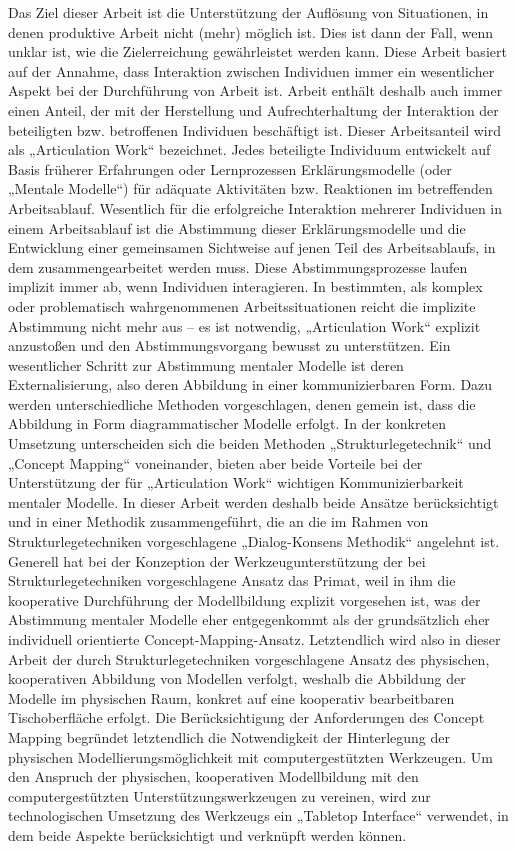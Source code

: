 Das Ziel dieser Arbeit ist die Unterstützung der Auflösung von Situationen, in denen produktive Arbeit nicht (mehr) möglich ist. Dies ist dann der Fall, wenn unklar ist, wie die Zielerreichung gewährleistet werden kann. Diese Arbeit basiert auf der Annahme, dass Interaktion zwischen Individuen immer ein wesentlicher Aspekt bei der Durchführung von Arbeit ist. Arbeit enthält deshalb auch immer einen Anteil, der mit der Herstellung und Aufrechterhaltung der Interaktion der beteiligten bzw. betroffenen Individuen beschäftigt ist. Dieser Arbeitsanteil wird als „Articulation Work“ bezeichnet. Jedes beteiligte Individuum entwickelt auf Basis früherer Erfahrungen oder Lernprozessen Erklärungsmodelle (oder „Mentale Modelle“) für adäquate Aktivitäten bzw. Reaktionen im betreffenden Arbeitsablauf. Wesentlich für die erfolgreiche Interaktion mehrerer Individuen in einem Arbeitsablauf ist die Abstimmung dieser Erklärungsmodelle und die Entwicklung einer gemeinsamen Sichtweise auf jenen Teil des Arbeitsablaufs, in dem zusammengearbeitet werden muss. Diese Abstimmungsprozesse laufen implizit immer ab, wenn Individuen interagieren. In bestimmten, als komplex oder problematisch wahrgenommenen Arbeitssituationen reicht die implizite Abstimmung nicht mehr aus -- es ist notwendig, „Articulation Work“ explizit anzustoßen und den Abstimmungsvorgang bewusst zu unterstützen. Ein wesentlicher Schritt zur Abstimmung mentaler Modelle ist deren Externalisierung, also deren Abbildung in einer kommunizierbaren Form. Dazu werden unterschiedliche Methoden vorgeschlagen, denen gemein ist, dass die Abbildung in Form diagrammatischer Modelle erfolgt. In der konkreten Umsetzung unterscheiden sich die beiden Methoden „Strukturlegetechnik“ und „Concept Mapping“ voneinander, bieten aber beide Vorteile bei der Unterstützung der für „Articulation Work“ wichtigen Kommunizierbarkeit mentaler Modelle. In dieser Arbeit werden deshalb beide Ansätze berücksichtigt und in einer Methodik zusammengeführt, die an die im Rahmen von Strukturlegetechniken vorgeschlagene „Dialog-Konsens Methodik“ angelehnt ist. Generell hat bei der Konzeption der Werkzeugunterstützung der bei Strukturlegetechniken vorgeschlagene Ansatz das Primat, weil in ihm die kooperative Durchführung der Modellbildung explizit vorgesehen ist, was der Abstimmung mentaler Modelle eher entgegenkommt als der grundsätzlich eher individuell orientierte Concept-Mapping-Ansatz. Letztendlich wird also in dieser Arbeit der durch Strukturlegetechniken vorgeschlagene Ansatz des physischen, kooperativen Abbildung von Modellen verfolgt, weshalb die Abbildung der Modelle im physischen Raum, konkret auf eine kooperativ bearbeitbaren Tischoberfläche erfolgt. Die Berücksichtigung der Anforderungen des Concept Mapping begründet letztendlich die Notwendigkeit der Hinterlegung der physischen Modellierungsmöglichkeit mit computergestützten Werkzeugen. Um den Anspruch der physischen, kooperativen Modellbildung mit den computergestützten Unterstützungswerkzeugen zu vereinen, wird zur technologischen Umsetzung des Werkzeugs ein „Tabletop Interface“ verwendet, in dem beide Aspekte berücksichtigt und verknüpft werden können.

